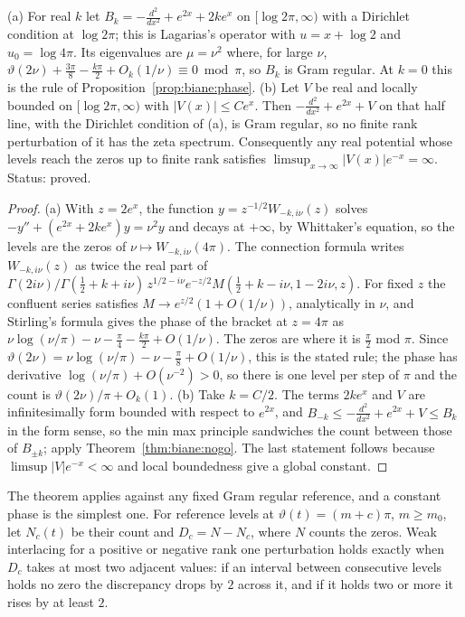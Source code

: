 \begin{proposition}\label{prop:biane:morse}
(a) For real $k$ let $B_k=-\frac{d^2}{dx^2}+e^{2x}+2ke^x$ on $[\log2\pi,\infty)$ with a Dirichlet condition at $\log2\pi$; this is Lagarias's operator with $u=x+\log2$ and $u_0=\log4\pi$. Its eigenvalues are $\mu=\nu^2$ where, for large $\nu$, $\vartheta(2\nu)+\frac{3\pi}8-\frac{k\pi}2+O_k(1/\nu)\equiv0\bmod\pi$, so $B_k$ is Gram regular. At $k=0$ this is the rule of Proposition~\ref{prop:biane:phase}. (b) Let $V$ be real and locally bounded on $[\log2\pi,\infty)$ with $|V(x)|\le Ce^x$. Then $-\frac{d^2}{dx^2}+e^{2x}+V$ on that half line, with the Dirichlet condition of (a), is Gram regular, so no finite rank perturbation of it has the zeta spectrum. Consequently any real potential whose levels reach the zeros up to finite rank satisfies $\limsup_{x\to\infty}|V(x)|e^{-x}=\infty$. Status: proved.
\end{proposition}

\begin{proof}
(a) With $z=2e^x$, the function $y=z^{-1/2}W_{-k,i\nu}(z)$ solves $-y''+(e^{2x}+2ke^x)y=\nu^2y$ and decays at $+\infty$, by Whittaker's equation, so the levels are the zeros of $\nu\mapsto W_{-k,i\nu}(4\pi)$. The connection formula \cite[(13.14.33)]{DLMF} writes $W_{-k,i\nu}(z)$ as twice the real part of $\Gamma(2i\nu)/\Gamma(\frac12+k+i\nu)\,z^{1/2-i\nu}e^{-z/2}M(\frac12+k-i\nu,1-2i\nu,z)$. For fixed $z$ the confluent series satisfies $M\to e^{z/2}(1+O(1/\nu))$, analytically in $\nu$, and Stirling's formula gives the phase of the bracket at $z=4\pi$ as $\nu\log(\nu/\pi)-\nu-\frac\pi4-\frac{k\pi}2+O(1/\nu)$. The zeros are where it is $\frac\pi2$ mod $\pi$. Since $\vartheta(2\nu)=\nu\log(\nu/\pi)-\nu-\frac\pi8+O(1/\nu)$, this is the stated rule; the phase has derivative $\log(\nu/\pi)+O(\nu^{-2})>0$, so there is one level per step of $\pi$ and the count is $\vartheta(2\nu)/\pi+O_k(1)$. (b) Take $k=C/2$. The terms $2ke^x$ and $V$ are infinitesimally form bounded with respect to $e^{2x}$, and $B_{-k}\le-\frac{d^2}{dx^2}+e^{2x}+V\le B_k$ in the form sense, so the min max principle sandwiches the count between those of $B_{\pm k}$; apply Theorem~\ref{thm:biane:nogo}. The last statement follows because $\limsup|V|e^{-x}<\infty$ and local boundedness give a global constant.
\end{proof}


The theorem applies against any fixed Gram regular reference, and a constant phase is the simplest one. For reference levels at $\vartheta(t)=(m+c)\pi$, $m\ge m_0$, let $N_c(t)$ be their count and $D_c=N-N_c$, where $N$ counts the zeros. Weak interlacing for a positive or negative rank one perturbation holds exactly when $D_c$ takes at most two adjacent values: if an interval between consecutive levels holds no zero the discrepancy drops by $2$ across it, and if it holds two or more it rises by at least $2$.

